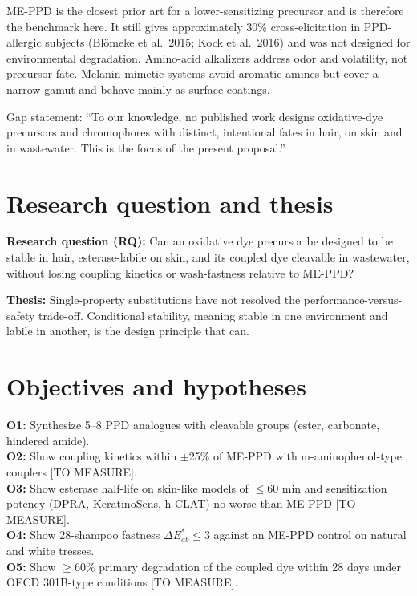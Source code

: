 \documentclass[11pt,a4paper]{article}
\begin{document}
ME-PPD is the closest prior art for a lower-sensitizing precursor and is therefore the benchmark here. It still gives approximately 30\% cross-elicitation in PPD-allergic subjects (Bl\"omeke et al.\ 2015; Kock et al.\ 2016) and was not designed for environmental degradation. Amino-acid alkalizers address odor and volatility, not precursor fate. Melanin-mimetic systems avoid aromatic amines but cover a narrow gamut and behave mainly as surface coatings.

Gap statement: ``To our knowledge, no published work designs oxidative-dye precursors and chromophores with distinct, intentional fates in hair, on skin and in wastewater. This is the focus of the present proposal.''

\section{Research question and thesis}

\textbf{Research question (RQ):} Can an oxidative dye precursor be designed to be stable in hair, esterase-labile on skin, and its coupled dye cleavable in wastewater, without losing coupling kinetics or wash-fastness relative to ME-PPD?

\textbf{Thesis:} Single-property substitutions have not resolved the performance-versus-safety trade-off. Conditional stability, meaning stable in one environment and labile in another, is the design principle that can.

\section{Objectives and hypotheses}

\textbf{O1:} Synthesize 5--8 PPD analogues with cleavable groups (ester, carbonate, hindered amide).\\
\textbf{O2:} Show coupling kinetics within $\pm$25\% of ME-PPD with m-aminophenol-type couplers [TO MEASURE].\\
\textbf{O3:} Show esterase half-life on skin-like models of $\leq$60 min and sensitization potency (DPRA, KeratinoSens, h-CLAT) no worse than ME-PPD [TO MEASURE].\\
\textbf{O4:} Show 28-shampoo fastness $\Delta E^*_{ab} \leq 3$ against an ME-PPD control on natural and white tresses.\\
\textbf{O5:} Show $\geq 60\%$ primary degradation of the coupled dye within 28 days under OECD 301B-type conditions [TO MEASURE].
\end{document}
